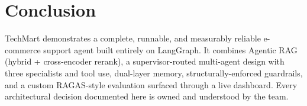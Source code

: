 \documentclass[11pt,a4paper]{article}
\begin{document}
\section{Conclusion}

TechMart demonstrates a complete, runnable, and measurably reliable e-commerce support agent built
entirely on LangGraph. It combines Agentic RAG (hybrid + cross-encoder rerank), a supervisor-routed
multi-agent design with three specialists and tool use, dual-layer memory, structurally-enforced
guardrails, and a custom RAGAS-style evaluation surfaced through a live dashboard. Every
architectural decision documented here is owned and understood by the team.
\end{document}
